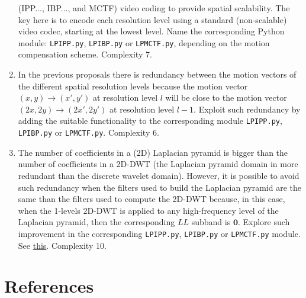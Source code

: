 \begin{enumerate}
  (IPP..., IBP..., and MCTF) video coding to provide spatial
  scalability. The key here is to encode each resolution level using a
  standard (non-scalable) video codec, starting at the lowest
  level. Name the corresponding Python module: \texttt{LPIPP.py},
  \texttt{LPIBP.py} or \texttt{LPMCTF.py}, depending on the motion
  compensation scheme. Complexity 7.
\item In the previous proposals there is redundancy between the motion
  vectors of the different spatial resolution levels because the
  motion vector $(x, y)\rightarrow (x', y')$ at resolution level $l$
  will be close to the motion vector $(2x, 2y)\rightarrow(2x',2y')$ at
  resolution level $l-1$. Exploit such redundancy by adding the
  suitable functionality to the corresponding module
  \texttt{LPIPP.py}, \texttt{LPIBP.py} or
  \texttt{LPMCTF.py}. Complexity 6.
\item The number of coefficients in a (2D) Laplacian pyramid is bigger
  than the number of coefficients in a 2D-DWT (the Laplacian pyramid
  domain in more redundant than the discrete wavelet domain). However,
  it is possible to avoid such redundancy when the filters used to
  build the Laplacian pyramid are the same than the filters used to
  compute the 2D-DWT because, in this case, when the 1-levels 2D-DWT
  is applied to any high-frequency level of the Laplacian pyramid,
  then the corresponding $LL$ subband is $\mathbf{0}$. Explore such
  improvement in the corresponding \texttt{LPIPP.py},
  \texttt{LPIBP.py} or \texttt{LPMCTF.py} module. See
  \href{https://vicente-gonzalez-ruiz.github.io/pyramids-and-wavelets/}{this}. Complexity
  10.
\end{enumerate}

\section{References}

\renewcommand{\addcontentsline}[3]{}%

